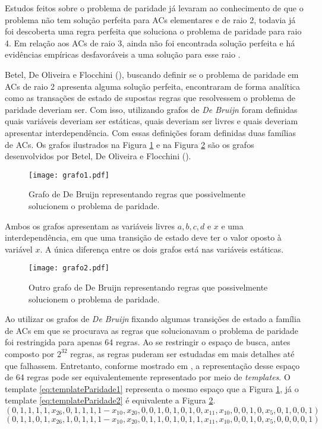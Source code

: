 Estudos feitos sobre o problema de paridade já levaram ao conhecimento de que o problema não tem solução perfeita para ACs elementares e de raio 2, todavia já foi descoberta uma regra perfeita que soluciona o problema de paridade para raio 4. Em relação aos ACs de raio 3, ainda não foi encontrada solução perfeita e há evidências empíricas desfavoráveis a uma solução para esse raio \cite{Betel2013}.

Betel, De Oliveira e Flocchini (\citeyear{Betel2013}), buscando definir se o problema de paridade em ACs de raio 2 apresenta alguma solução perfeita, encontraram de forma analítica como as transações de estado de supostas regras que resolvessem o problema de paridade deveriam ser. Com isso, utilizando grafos de \textit{De Bruijn} foram definidas quais variáveis deveriam ser estáticas, quais deveriam ser livres e quais deveriam apresentar interdependência. Com essas definições foram definidas duas famílias de ACs. Os grafos ilustrados na Figura \ref{fig:grafosDeBruijn} e na Figura \ref{fig:grafosDeBruijn2} são os grafos desenvolvidos por Betel, De Oliveira e Flocchini (\citeyear{Betel2013}).

\begin{figure}[h!]
\centering
\texttt{[image: grafo1.pdf]}
\caption{Grafo de De Bruijn representando regras que possivelmente solucionem o problema de paridade.}
\label{fig:grafosDeBruijn}
\end{figure}

Ambos os grafos apresentam as variáveis livres $a, b, c, d \text{ e } x$ e uma interdependência, em que uma transição de estado deve ter o valor oposto à variável $x$. A única diferença entre os dois grafos está nas variáveis estáticas.

\begin{figure}[h!]
\centering
\texttt{[image: grafo2.pdf]}
\caption{Outro grafo de De Bruijn representando regras que possivelmente solucionem o problema de paridade.}
\label{fig:grafosDeBruijn2}
\end{figure}

Ao utilizar os grafos de \textit{De Bruijn} fixando algumas transições de estado a família de ACs em que se procurava as regras que solucionavam o problema de paridade foi restringida para apenas 64 regras. Ao se restringir o espaço de busca, antes composto por $2^{32}$ regras, as regras puderam ser estudadas em mais detalhes até que falhassem. Entretanto, conforme mostrado em \cite{Verardo2014}, a representação desse espaço de 64 regras pode ser equivalentemente representado por meio de \textit{templates}. O template \ref{eq:templateParidade1} representa o mesmo espaço que a Figura \ref{fig:grafosDeBruijn}, já o template \ref{eq:templateParidade2} é equivalente a Figura \ref{fig:grafosDeBruijn2}.
\begin{equation}
\left(0,1,1,1,1,x_{26},0,1,1,1,1-x_{10},x_{20},0,0,1,0,1,0,1,0,x_{11},x_{10},0,0,1,0,x_5,0,1,0,0,1\right)
\label{eq:templateParidade1}
\end{equation}
\begin{equation}
\left(0,1,1,0,1,x_{26},1,0,1,1,1-x_{10},x_{20},0,1,1,0,1,0,1,1,x_{11},x_{10},0,0,1,0,x_5,0,0,0,0,1\right)
\label{eq:templateParidade2}
\end{equation}


